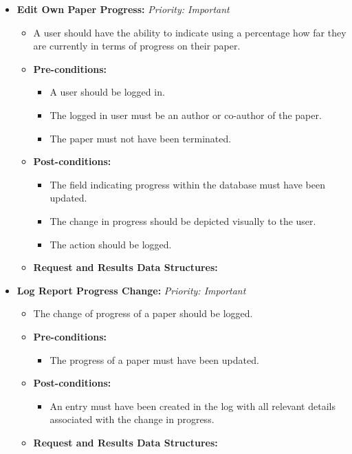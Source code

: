 \documentclass{article}
\begin{document}
\begin{itemize}
					\item \textbf{Edit Own Paper Progress:} \hfill \textit{Priority: Important}
					\begin{itemize}
						\item A user should have the ability to indicate using a percentage how far they are currently in terms of progress on their paper.
						\item \textbf{Pre-conditions:}
						\begin{itemize}
							\item A user should be logged in.
							\item The logged in user must be an author or co-author of the paper.
							\item The paper must not have been terminated.
						\end{itemize}
						\item \textbf{Post-conditions:}
						\begin{itemize}
							\item The field indicating progress within the database must have been updated.
							\item The change in progress should be depicted visually to the user.
							\item The action should be logged.
						\end{itemize}
						\item \textbf{Request and Results Data Structures:}
					\end{itemize}
					
					\item \textbf{Log Report Progress Change:} \hfill \textit{Priority: Important}
					\begin{itemize}
						\item The change of progress of a paper should be logged.
						\item \textbf{Pre-conditions:}
						\begin{itemize}
							\item The progress of a paper must have been updated.
						\end{itemize}
						\item \textbf{Post-conditions:}
						\begin{itemize}
							\item An entry must have been created in the log with all relevant details associated with the change in progress.
						\end{itemize}
						\item \textbf{Request and Results Data Structures:}
					\end{itemize}					
					

\end{itemize}
\end{document}
